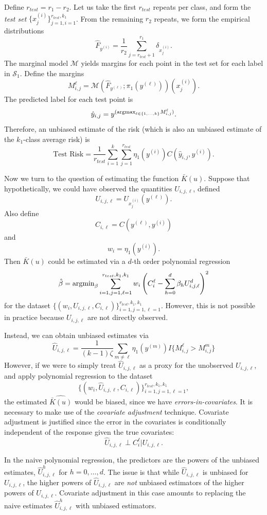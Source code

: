 \documentclass[12pt]{article}
\begin{document}
Define $r_{test} = r_1 - r_2$.  Let us take the first $r_{test}$
repeats per class, and form the \emph{test set} $\{x_j^{(i)}\}_{j=1,
  i=1}^{r_{test}, k_1}$.  From the remaining $r_2$ repeats, we form
the empirical distributions
\[
\hat{F}_{y^{(i)}} = \frac{1}{r_2}\sum_{j=r_{test} + 1}^{r_1} \delta_{x_j^{(i)}}.
\]
The marginal model $\mathcal{M}$ yields margins for each point in the
test set for each label in $\mathcal{S}_1$.  Define the margins
\[
M_{i, j}^\ell = \mathcal{M}(\hat{F}_{y^{(\ell)}}; \pi_1(y^{(\ell)}))(x_j^{(i)}).
\]
The predicted label for each test point is
\[
\hat{y}_{i,j} = y^{(\text{argmax}_{\ell \in \{1,\hdots, k\}} M_{i, j}^\ell)}.
\]
Therefore, an unbiased estimate of the risk (which is also an unbiased
estimate of the $k_1$-class average risk) is
\[
\text{Test Risk} = \frac{1}{r_{test}}\sum_{i=1}^k \sum_{j=1}^{r_{test}} \eta_1(y^{(i)}) C(\hat{y}_{i, j}, y^{(i)}).
\]

Now we turn to the question of estimating the function $\bar{K}(u)$.
Suppose that hypothetically, we could have observed the quantities
$U_{i, j, \ell}$, defined
\[
U_{i, j, \ell} = U_{x_j^{(i)}}(y^{(\ell)}).
\]
Also define
\[
C_{i,\ell} = C(y^{(\ell)}, y^{(i)})
\]
and
\[
w_i = \eta_1(y^{(i)}).
\]
Then $\bar{K}(u)$ could be estimated via a $d$-th order polynomial regression
\[
\hat{\beta} = \text{argmin}_{\beta} \sum_{i=1,j=1, \ell=1}^{r_{test}, k_1, k_1} w_i \left(C_i^\ell - \sum_{h=0}^d \beta_h U_{i,j, \ell}^d\right)^2
\]
for the
dataset $\{(w_i, U_{i,j, \ell}, C_{i,\ell})\}_{i=1, j=1,
  \ell=1}^{r_{test}, k_1, k_1}$.  However, this is not possible in
practice because $U_{i,j,\ell}$ are not directly observed.

Instead, we can obtain unbiased estimates via
\[
\hat{U}_{i,j, \ell} = \frac{1}{(k-1)\zeta}\sum_{m \neq \ell} \eta_1(y^{(m)}) I\{M_{i, j}^\ell > M_{i, j}^m\}
\]
However, if we were to simply treat $\hat{U}_{i, j, \ell}$ as a proxy
for the unobserved $U_{i,j,\ell}$, and apply polynomial regression to
the dataset
\[
\{(w_i, \hat{U}_{i,j, \ell}, C_{i, \ell})\}_{i=1, j=1, \ell=1}^{r_{test}, k_1,k_1},
\]
the estimated $\widehat{\bar{K}(u)}$ would be biased, since we have
\emph{errors-in-covariates}.  It is necessary to make use of the
\emph{covariate adjustment} technique.  Covariate adjustment is
justified since the error in the covariates is conditionally
independent of the response given the true covariates:
\[
\hat{U}_{i,j,\ell} \perp C_i^\ell | U_{i, j,\ell}.
\]

In the naive polynomial regression, the predictors are the powers of
the unbiased estimates, $\hat{U}_{i,j,\ell}^h$ for $h = 0,\hdots, d$.
The issue is that while $\hat{U}_{i,j,\ell}$ is unbiased for
$U_{i,j,\ell}$, the higher powers of $\hat{U}_{i,j,\ell}$ are
\emph{not} unbiased estimators of the higher powers of $U_{i,j,\ell}$.
Covariate adjustment in this case amounts to replacing the naive
estimates $\hat{U}_{i,j,\ell}^h$ with unbiased estimators.
\end{document}

